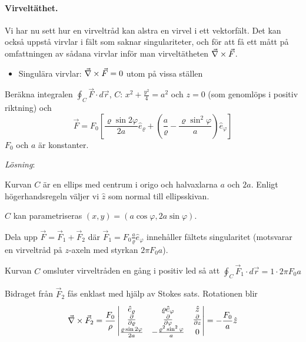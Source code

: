 \documentclass[%
oneside,                 %
final,                   %
10pt]{article}
\newenvironment{notice_mdfboxadmon}[1][]{
\begin{notice_mdfboxmdframed}[frametitle=#1]
}
{
\end{notice_mdfboxmdframed}
}
\newenvironment{warning_mdfboxadmon}[1][]{
\begin{warning_mdfboxmdframed}[frametitle=#1]
}
{
\end{warning_mdfboxmdframed}
}
\begin{document}
\paragraph{Virveltäthet.}
Vi har nu sett hur en virveltråd kan alstra en virvel i ett vektorfält. Det kan också uppstå virvlar i fält som saknar singulariteter, och för att få ett mått på omfattningen av sådana virvlar inför man virveltätheten $\vec{\nabla} \times \vec{F}$.

\begin{itemize}
\item Singulära virvlar: $\vec{\nabla} \times \vec{F} = 0$ utom på vissa ställen 
\end{itemize}

\noindent

\begin{notice_mdfboxadmon}[Exempel: 6.3]

Beräkna integralen $\oint_C \vec F \cdot d\vec{r}$, $C$: $x^2 + \frac{y^2}{4} = a^2$ och $z = 0$ (som genomlöps i positiv riktning) och 
\begin{equation}
  \vec F = F_0 \left[\frac{\varrho \sin 2\varphi}{2a} \hat{e}_\varrho
+ \left(\frac{a}{\varrho} - \frac{\varrho \sin^2 \varphi}{a}\right)\hat{e}_\varphi
\right]
\end{equation}
$F_0$ och $a$ är konstanter.

\emph{Lösning}:  


\begin{warning_mdfboxadmon}[Kommentar]
Kurvan $C$ är en ellips med centrum i origo och halvaxlarna
$a$ och $2a$. Enligt högerhandsregeln väljer vi $\hat z$ som
normal till ellipsskivan.
\end{warning_mdfboxadmon} %



$C$ kan parametriseras $(x,y) = (a\cos\varphi,2a\sin\varphi)$.

Dela upp $\vec{F} = \vec{F}_1 + \vec{F}_2$ där $\vec F_1=F_0 \frac{a}{\varrho}\hat{e}_\varphi$ innehåller fältets singularitet
(motsvarar en virveltråd på $z$-axeln med styrkan $2\pi F_0a$). 

Kurvan $C$ omsluter virveltråden en gång i positiv led så att $\oint_C \vec{F}_1 \cdot d\vec{r} = 1 \cdot 2\pi F_0a$

Bidraget från $\vec F_2$ fås enklast med hjälp av Stokes sats. Rotationen blir
\begin{equation}
  \vec{\nabla} \times\vec{F}_2 = \frac{F_0}{\rho} 
  	\begin{vmatrix}
	\hat{e}_\varrho & \varrho \hat{e}_\varphi & \hat z \\ 
	\frac{\partial}{\partial \varrho} & \frac{\partial}{\partial \varphi} &
                       \frac{\partial}{\partial z} \\ 
	\frac{\varrho \sin 2\varphi}{2a} & -\frac{\varrho^2\sin^2 \varphi}{a} & 0
	\end{vmatrix} =- \frac{F_0}{a}\hat z
\end{equation}


\end{notice_mdfboxadmon}
\end{document}

